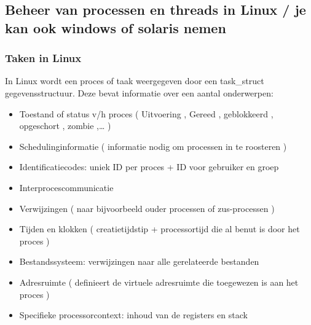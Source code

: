 \subsection{Beheer van processen en threads in Linux / je kan ook windows of solaris nemen}

\subsubsection{Taken in Linux}

In Linux wordt een proces of taak weergegeven door een task\_struct gegevensstructuur. Deze bevat informatie over een aantal onderwerpen:

















\begin{itemize}
\item Toestand of status v/h proces ( Uitvoering , Gereed , geblokkeerd , opgeschort , zombie ,… )
\item Schedulinginformatie ( informatie nodig om processen in te roosteren )
\item Identificatiecodes: uniek ID per proces + ID voor gebruiker en groep
\item Interprocescommunicatie
\item Verwijzingen ( naar bijvoorbeeld ouder processen of zus-processen )
\item Tijden en klokken ( creatietijdstip + processortijd die al benut is door het proces )
\item Bestandssysteem: verwijzingen naar alle gerelateerde bestanden
\item Adresruimte ( definieert de virtuele adresruimte die toegewezen is aan het proces )
\item Specifieke processorcontext: inhoud van de registers en stack
\end{itemize}


